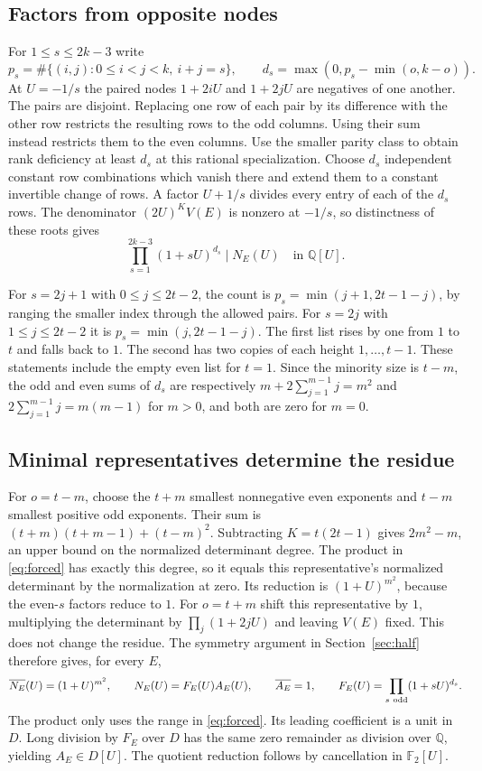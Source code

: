 \documentclass[10pt]{article}
\newcommand{\Q}{\mathbb Q}
\newcommand{\Fp}{\mathbb F}
\begin{document}
\subsection{Factors from opposite nodes}
For $1\le s\le 2k-3$ write
\[
 p_s=\#\{(i,j):0\le i<j<k,\ i+j=s\},\qquad
 d_s=\max(0,p_s-\min(o,k-o)).
\]
At $U=-1/s$ the paired nodes $1+2iU$ and $1+2jU$ are negatives of
one another. The pairs are disjoint. Replacing one row of each pair
by its difference with the other row restricts the resulting rows to
the odd columns. Using their sum instead restricts them to the even
columns. Use the smaller parity class to obtain rank deficiency at
least $d_s$ at this rational specialization. Choose $d_s$ independent
constant row combinations which vanish there and extend them to a
constant invertible change of rows. A factor $U+1/s$ divides every
entry of each of the $d_s$ rows. The denominator $(2U)^K V(E)$ is
nonzero at $-1/s$, so distinctness of these roots gives
\begin{equation}\label{eq:forced}
 \prod_{s=1}^{2k-3}(1+sU)^{d_s}\mid N_E(U)\quad\text{in }\Q[U].
\end{equation}

For $s=2j+1$ with $0\le j\le 2t-2$, the count is
$p_s=\min(j+1,2t-1-j)$, by ranging the smaller index through the
allowed pairs. For $s=2j$ with $1\le j\le 2t-2$ it is
$p_s=\min(j,2t-1-j)$.
The first list rises by one from $1$ to $t$ and falls back to $1$.
The second has two copies of each height $1,\ldots,t-1$.
These statements include the empty even list for $t=1$.
Since the minority size is $t-m$, the odd and even sums of $d_s$
are respectively $m+2\sum_{j=1}^{m-1}j=m^2$ and
$2\sum_{j=1}^{m-1}j=m(m-1)$ for $m>0$, and both are zero for $m=0$.

\subsection{Minimal representatives determine the residue}
For $o=t-m$, choose the $t+m$ smallest nonnegative even exponents and
$t-m$ smallest positive odd exponents. Their sum is
$(t+m)(t+m-1)+(t-m)^2$. Subtracting $K=t(2t-1)$ gives $2m^2-m$,
an upper bound on the normalized determinant degree. The product
in \eqref{eq:forced} has exactly this degree, so it equals this
representative's normalized determinant by the normalization at zero.
Its reduction is $(1+U)^{m^2}$, because the even-$s$ factors reduce
to $1$. For $o=t+m$ shift this representative by $1$,
multiplying the determinant by $\prod_j(1+2jU)$ and leaving $V(E)$
fixed. This does not change the residue. The symmetry argument in
Section~\ref{sec:half} therefore gives, for every $E$,
\[
 \overline{N_E}(U)=(1+U)^{m^2},\qquad
 N_E(U)=F_E(U)A_E(U),\qquad \overline{A_E}=1,\qquad
 F_E(U)=\prod_{s\ {\rm odd}}(1+sU)^{d_s}.
\]
The product only uses the range in \eqref{eq:forced}. Its leading
coefficient is a unit in $D$. Long division by $F_E$ over $D$
has the same zero remainder as division over $\Q$, yielding
$A_E\in D[U]$. The quotient reduction follows by cancellation
in $\Fp_2[U]$.
\end{document}
